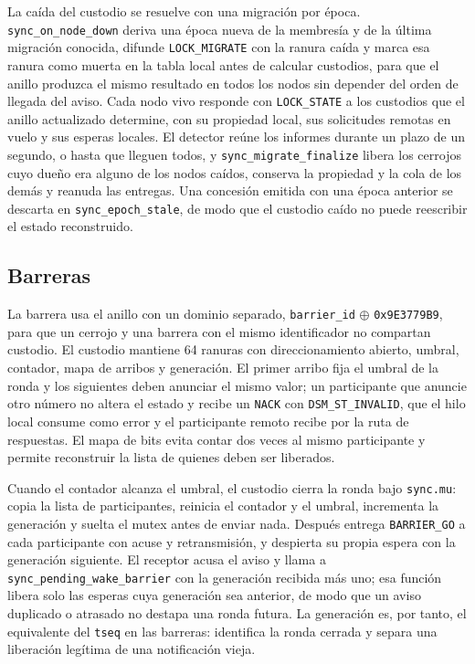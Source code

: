 La caída del custodio se resuelve con una migración por época. \texttt{sync\_on\_node\_down} deriva una época nueva de la membresía y de la última migración conocida, difunde \texttt{LOCK\_MIGRATE} con la ranura caída y marca esa ranura como muerta en la tabla local antes de calcular custodios, para que el anillo produzca el mismo resultado en todos los nodos sin depender del orden de llegada del aviso. Cada nodo vivo responde con \texttt{LOCK\_STATE} a los custodios que el anillo actualizado determine, con su propiedad local, sus solicitudes remotas en vuelo y sus esperas locales. El detector reúne los informes durante un plazo de un segundo, o hasta que lleguen todos, y \texttt{sync\_migrate\_finalize} libera los cerrojos cuyo dueño era alguno de los nodos caídos, conserva la propiedad y la cola de los demás y reanuda las entregas. Una concesión emitida con una época anterior se descarta en \texttt{sync\_epoch\_stale}, de modo que el custodio caído no puede reescribir el estado reconstruido.

\subsection{Barreras}

La barrera usa el anillo con un dominio separado, \texttt{barrier\_id} $\oplus$ \texttt{0x9E3779B9}, para que un cerrojo y una barrera con el mismo identificador no compartan custodio. El custodio mantiene 64 ranuras con direccionamiento abierto, umbral, contador, mapa de arribos y generación. El primer arribo fija el umbral de la ronda y los siguientes deben anunciar el mismo valor; un participante que anuncie otro número no altera el estado y recibe un \texttt{NACK} con \texttt{DSM\_ST\_INVALID}, que el hilo local consume como error y el participante remoto recibe por la ruta de respuestas. El mapa de bits evita contar dos veces al mismo participante y permite reconstruir la lista de quienes deben ser liberados.

Cuando el contador alcanza el umbral, el custodio cierra la ronda bajo \texttt{sync.mu}: copia la lista de participantes, reinicia el contador y el umbral, incrementa la generación y suelta el mutex antes de enviar nada. Después entrega \texttt{BARRIER\_GO} a cada participante con acuse y retransmisión, y despierta su propia espera con la generación siguiente. El receptor acusa el aviso y llama a \texttt{sync\_pending\_wake\_barrier} con la generación recibida más uno; esa función libera solo las esperas cuya generación sea anterior, de modo que un aviso duplicado o atrasado no destapa una ronda futura. La generación es, por tanto, el equivalente del \texttt{tseq} en las barreras: identifica la ronda cerrada y separa una liberación legítima de una notificación vieja.

